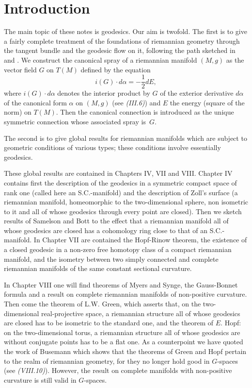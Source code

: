 \thispagestyle{empty}

\chapter{Introduction}

The main topic of these notes is geodesics. Our aim is twofold. The
first is to give a fairly complete treatment of the foundations of
riemannian geometry through the tangent bundle and the geodesic flow
on it, following the path sketched in \cite{2} and \cite{19}. We
construct the canonical spray of a riemannian manifold $(M,g)$ as the
vector field $G$ on $T(M)$ defined by the equation 
$$
i(G)\cdot d\alpha =-\dfrac{1}{2}dE,
$$
where $i(G)\cdot d\alpha$ denotes the interior product by $G$ of the
exterior derivative $d\alpha$ of the canonical form $\alpha$ on
$(M,g)$ (see \textit{(III.6)}) and $E$ the energy (square of the norm)
on $T(M)$. Then the canonical connection is introduced as the unique
symmetric connection whose associated spray is~$G$.

The second is to give global results for riemannian manifolds which
are subject to geometric conditions of various types; these conditions
involve essentially geodesics.

These global results are contained in Chapters IV, VII and
VIII. Chapter IV contains first the description of the geodesics in a
symmetric compact space of rank one (called here an S.C.-manifold) and
the description of Zoll's surface (a riemannian manifold, homeomorphic
to the two-dimensional sphere, non isometric to it and all of whose
geodesics through every point are closed). Then we sketch results of
Samelson and Bott to the effect that a riemannian manifold all of
whose geodesics are closed has a cohomology ring close to that of an
S.C.-manifold. In Chapter VII are contained the Hopf-Rinow theorem,
the existence of a closed geodesic in a non-zero free homotopy class
of a compact riemannian manifold, and the isometry between two simply
connected and complete riemannian manifolds of the same constant
sectional curvature.

In Chapter VIII one will find theorems of Myers and Synge, the
Gauss-Bonnet formula and a result on complete riemannian manifolds of
non-positive curvature. Then come the theorem of L.W. Green, which
asserts that, on the two-dimensional real-projective space, a
riemannian structure all of whose geodesics are closed has to be
isometric to the standard one, and the theorem of $E$. Hopf: on the
two-dimensional torus, a riemannian structure all of whose geodesics
are without conjugate points has to be a flat one. As a counterpoint
we have quoted the work of Busemann which shows that the theorems of
Green and Hopf pertain to the realm of riemannian geometry, for they
no longer hold good in $G$-spaces (see {\em (VIII.10)}). However, the
result on complete manifolds with non-positive curvature is still
valid in $G$-spaces.

